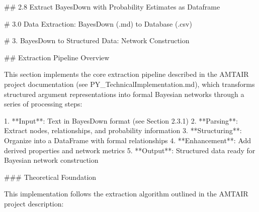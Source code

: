 \documentclass[
  11pt,
  letterpaper,
]{book}
\newenvironment{Shaded}{\begin{snugshade}}{\end{snugshade}}
\newcommand{\ErrorTok}[1]{\textcolor[rgb]{0.68,0.00,0.00}{#1}}
\begin{document}
\begin{Shaded}
\begin{Highlighting}[]
\ErrorTok{\#\#} \ErrorTok{2.8} \ErrorTok{Extract} \ErrorTok{BayesDown} \ErrorTok{with} \ErrorTok{Probability} \ErrorTok{Estimates} \ErrorTok{as} \ErrorTok{Dataframe}

\ErrorTok{\#} \ErrorTok{3.0} \ErrorTok{Data} \ErrorTok{Extraction:} \ErrorTok{BayesDown} \ErrorTok{(.md)} \ErrorTok{to} \ErrorTok{Database} \ErrorTok{(.csv)}

\ErrorTok{\#} \ErrorTok{3.} \ErrorTok{BayesDown} \ErrorTok{to} \ErrorTok{Structured} \ErrorTok{Data:} \ErrorTok{Network} \ErrorTok{Construction}

\ErrorTok{\#\#} \ErrorTok{Extraction} \ErrorTok{Pipeline} \ErrorTok{Overview}

\ErrorTok{This} \ErrorTok{section} \ErrorTok{implements} \ErrorTok{the} \ErrorTok{core} \ErrorTok{extraction} \ErrorTok{pipeline} \ErrorTok{described} \ErrorTok{in} \ErrorTok{the} \ErrorTok{AMTAIR} \ErrorTok{project} \ErrorTok{documentation} \ErrorTok{(see} \ErrorTok{\textasciigrave{}PY\_TechnicalImplementation.md\textasciigrave{}),} \ErrorTok{which} \ErrorTok{transforms} \ErrorTok{structured} \ErrorTok{argument} \ErrorTok{representations} \ErrorTok{into} \ErrorTok{formal} \ErrorTok{Bayesian} \ErrorTok{networks} \ErrorTok{through} \ErrorTok{a} \ErrorTok{series} \ErrorTok{of} \ErrorTok{processing} \ErrorTok{steps:}

\ErrorTok{1.} \ErrorTok{**Input**:} \ErrorTok{Text} \ErrorTok{in} \ErrorTok{BayesDown} \ErrorTok{format} \ErrorTok{(see} \ErrorTok{Section} \ErrorTok{2.3.1)}
\ErrorTok{2.} \ErrorTok{**Parsing**:} \ErrorTok{Extract} \ErrorTok{nodes,} \ErrorTok{relationships,} \ErrorTok{and} \ErrorTok{probability} \ErrorTok{information}
\ErrorTok{3.} \ErrorTok{**Structuring**:} \ErrorTok{Organize} \ErrorTok{into} \ErrorTok{a} \ErrorTok{DataFrame} \ErrorTok{with} \ErrorTok{formal} \ErrorTok{relationships}
\ErrorTok{4.} \ErrorTok{**Enhancement**:} \ErrorTok{Add} \ErrorTok{derived} \ErrorTok{properties} \ErrorTok{and} \ErrorTok{network} \ErrorTok{metrics}
\ErrorTok{5.} \ErrorTok{**Output**:} \ErrorTok{Structured} \ErrorTok{data} \ErrorTok{ready} \ErrorTok{for} \ErrorTok{Bayesian} \ErrorTok{network} \ErrorTok{construction}

\ErrorTok{\#\#\#} \ErrorTok{Theoretical} \ErrorTok{Foundation}

\ErrorTok{This} \ErrorTok{implementation} \ErrorTok{follows} \ErrorTok{the} \ErrorTok{extraction} \ErrorTok{algorithm} \ErrorTok{outlined} \ErrorTok{in} \ErrorTok{the} \ErrorTok{AMTAIR} \ErrorTok{project} \ErrorTok{description:}


\end{Highlighting}
\end{Shaded}
\end{document}
